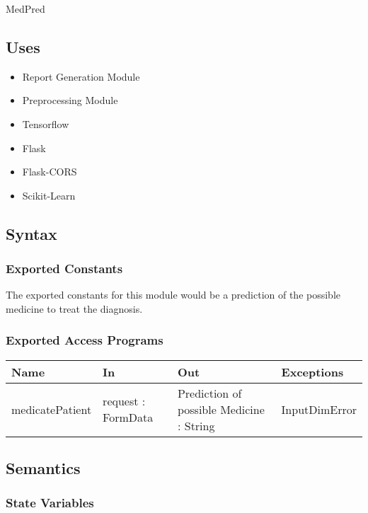 \documentclass[12pt, titlepage]{article}
\begin{document}
MedPred

\subsection{Uses}
\begin{itemize}
  \item Report Generation Module    
  \item Preprocessing Module
  \item Tensorflow
  \item Flask
  \item Flask-CORS
  \item Scikit-Learn

\end{itemize}

\subsection{Syntax}

\subsubsection{Exported Constants}
The exported constants for this module would be a prediction of the possible medicine to treat the diagnosis.

\subsubsection{Exported Access Programs}

\begin{center}
\begin{tabular}{p{2cm} p{4cm} p{4cm} p{2cm}}
\hline
\textbf{Name} & \textbf{In} & \textbf{Out} & \textbf{Exceptions} \\
\hline
medicatePatient & request : FormData & Prediction of possible Medicine : String & InputDimError \\
\hline
\end{tabular}
\end{center}

\subsection{Semantics}

\subsubsection{State Variables}
\end{document}
